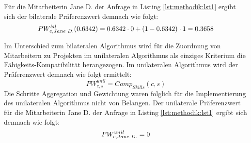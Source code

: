 Für die Mitarbeiterin Jane D. der Anfrage in Listing \ref{lst:methodik:lst1} ergibt sich der bilaterale Präferenzwert demnach wie folgt:
\begin{equation}\label{methodik:eq:9}
    PW_{c,Jane \textnormal{ }D.}^{bil}(0.6342) = 0.6342 \cdot 0 + (1-0.6342) \cdot 1 = 0.3658
\end{equation}

Im Unterschied zum bilateralen Algorithmus wird für die Zuordnung von Mitarbeitern zu Projekten im unilateralen Algorithmus als einziges Kriterium die Fähigkeits-Kompatibilität herangezogen.
Im unilateralen Algorithmus wird der Präferenzwert demnach wie folgt ermittelt:
\begin{equation}\label{methodik:eq:8}
    PW_{c,s}^{unil} = Comp_{Skills}(c,s)
\end{equation}
Die Schritte Aggregation und Gewichtung waren folglich für die Implementierung des unilateralen Algorithmus nicht von Belangen.
Der unilaterale Präferenzwert für die Mitarbeiterin Jane D. der Anfrage in Listing \ref{lst:methodik:lst1} ergibt sich demnach wie folgt:
\begin{equation}\label{methodik:eq:10}
    PW_{c,Jane \textnormal{ }D.}^{unil} = 0
\end{equation}



